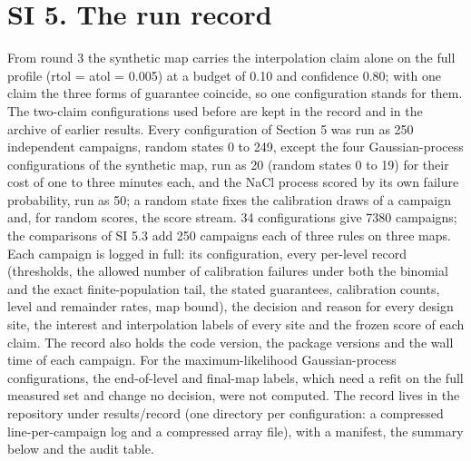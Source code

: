 \documentclass{iopjournal}
\begin{document}
\hypertarget{si-5.-the-run-record}{%
\section*{SI 5. The run record}\label{si-5.-the-run-record}}

From round 3 the synthetic map carries the interpolation claim alone on the full profile (rtol = atol = 0.005) at a budget of 0.10 and confidence 0.80; with one claim the three forms of guarantee coincide, so one configuration stands for them. The two-claim configurations used before are kept in the record and in the archive of earlier results. Every configuration of Section 5 was run as 250 independent campaigns, random states 0 to 249, except the four Gaussian-process configurations of the synthetic map, run as 20 (random states 0 to 19) for their cost of one to three minutes each, and the NaCl process scored by its own failure probability, run as 50; a random state fixes the calibration draws of a campaign and, for random scores, the score stream. 34 configurations give 7380 campaigns; the comparisons of SI 5.3 add 250 campaigns each of three rules on three maps. Each campaign is logged in full: its configuration, every per-level record (thresholds, the allowed number of calibration failures under both the binomial and the exact finite-population tail, the stated guarantees, calibration counts, level and remainder rates, map bound), the decision and reason for every design site, the interest and interpolation labels of every site and the frozen score of each claim. The record also holds the code version, the package versions and the wall time of each campaign. For the maximum-likelihood Gaussian-process configurations, the end-of-level and final-map labels, which need a refit on the full measured set and change no decision, were not computed. The record lives in the repository under results/record (one directory per configuration: a compressed line-per-campaign log and a compressed array file), with a manifest, the summary below and the audit table.
\end{document}
